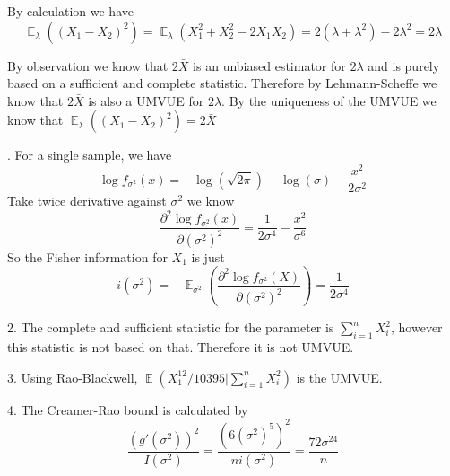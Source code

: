 \documentclass[12pt]{article}
\newenvironment{problem}[2][Problem]{\begin{trivlist}
\item[\hskip \labelsep {\bfseries #1}\hskip \labelsep {\bfseries #2.}]}{\end{trivlist}}
\newcommand{\E}{\operatorname{\mathbb{E}}}
\begin{document}
By calculation we have
$$
\E_\lambda ( (X_1 - X_2)^2) = \E_\lambda(X_1^2 + X_2^2 - 2X_1X_2) = 2(\lambda +\lambda^2) - 2\lambda^2 = 2\lambda
$$

By observation we know that $2\bar{X}$ is an unbiased estimator for $2\lambda$ and is purely based on a sufficient and complete statistic. Therefore by Lehmann-Scheffe we know that $2\bar{X}$ is also a UMVUE for $2\lambda$. By the uniqueness of the UMVUE we know that $\E_\lambda ( (X_1 - X_2)^2) = 2\bar{X}$

\begin{problem}{3}
\end{problem}
1. For a single sample, we have
$$
\log f_{\sigma^2}(x) = -\log(\sqrt{2\pi}) - \log (\sigma) - \frac{x^2}{2\sigma^2}
$$
Take twice derivative against $\sigma^2$ we know
$$
\frac{\partial^2 \log f_{\sigma^2}(x)}{\partial (\sigma^2)^2} = \frac{1}{2\sigma^4} - \frac{x^2}{\sigma^6}
$$
So the Fisher information for $X_1$ is just
$$
i(\sigma^2) = - \E_{\sigma^2}(\frac{\partial^2 \log f_{\sigma^2}(X)}{\partial (\sigma^2)^2}) = \frac{1}{2\sigma^4}
$$

2. The complete and sufficient statistic for the parameter is $\sum_{i=1}^n X_i^2$, however this statistic is not based on that. Therefore it is not UMVUE.

3. Using Rao-Blackwell, $\E (X_1^{12}/ 10395 | \sum_{i=1}^n X_i^2)$ is the UMVUE. 

4. The Creamer-Rao bound is calculated by
$$
\frac{(g'(\sigma^2))^2}{I(\sigma^2)} = \frac{(6(\sigma^2)^5)^2}{ni(\sigma^2)} = \frac{72\sigma^{24}}{n}
$$

\end{document}
